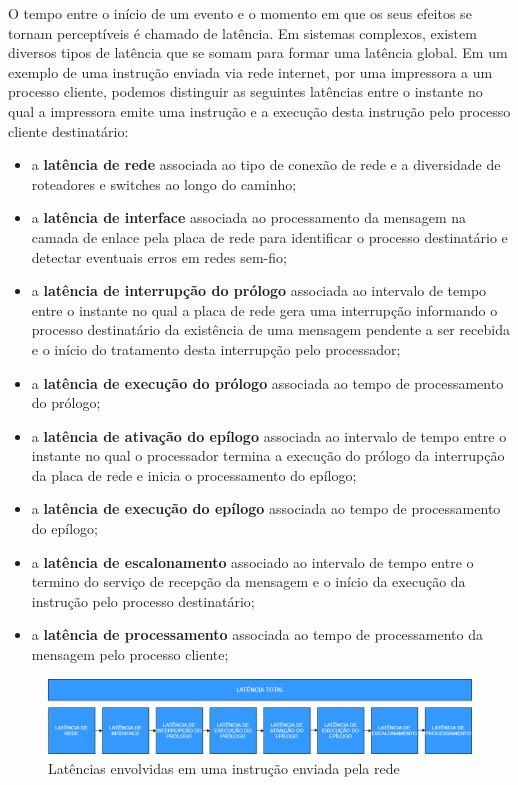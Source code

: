 O tempo entre o início de um evento e o momento em que os seus efeitos se tornam perceptíveis é chamado de latência. Em sistemas complexos, existem diversos tipos de latência que se somam para formar uma latência global. Em um exemplo de uma instrução enviada via rede internet, por uma impressora a um processo cliente, podemos distinguir as seguintes latências entre o instante no qual a impressora emite uma instrução e a execução desta instrução pelo processo cliente destinatário: 

\begin{itemize}
    \item a \textbf{latência de rede} associada ao tipo de conexão de rede e a diversidade de roteadores e switches ao longo do caminho;
    \item a \textbf{latência de interface} associada ao processamento da mensagem na camada de enlace pela placa de rede para identificar o processo destinatário e detectar eventuais erros em redes sem-fio;
    \item a \textbf{latência de interrupção do prólogo} associada ao intervalo de tempo entre o instante no qual a placa de rede gera uma interrupção informando o processo destinatário da existência de uma mensagem pendente a ser recebida e o início do tratamento desta interrupção pelo processador;
    \item a \textbf{latência de execução do prólogo} associada ao tempo de processamento do prólogo;
    \item a \textbf{latência de ativação do epílogo} associada ao intervalo de tempo entre o instante no qual o processador termina a execução do prólogo da interrupção da placa de rede e inicia o processamento do epílogo;
    \item a \textbf{latência de execução do epílogo} associada ao tempo de processamento do epílogo;
    \item a \textbf{latência de escalonamento} associado ao intervalo de tempo entre o termino do serviço de recepção da mensagem e o início da execução da instrução pelo processo destinatário;
    \item a \textbf{latência de processamento} associada ao tempo de processamento da mensagem pelo processo cliente;
\end{itemize}

\begin{figure}[!htb]
    \centering
    \includegraphics[width=\textwidth]{graficos/latencias.png}
    \caption{Latências envolvidas em uma instrução enviada pela rede}
    \label{flux:latencias}
\end{figure}


